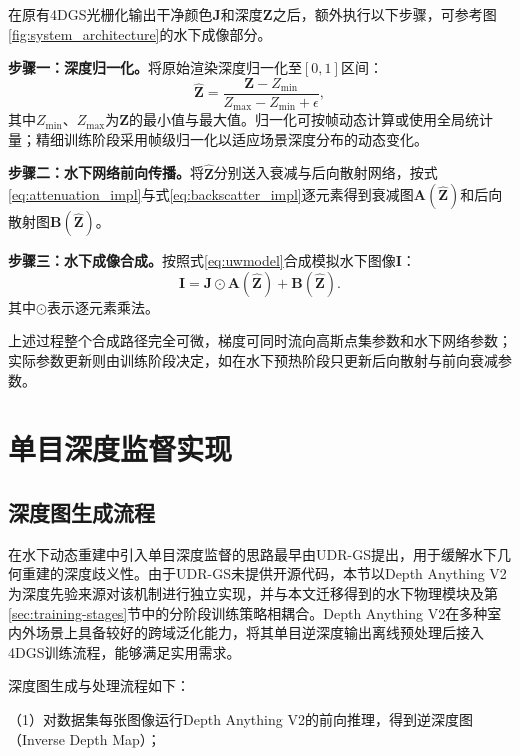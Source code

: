 在原有4DGS光栅化输出干净颜色$\mathbf{J}$和深度$\mathbf{Z}$之后，额外执行以下步骤，可参考图\ref{fig:system_architecture}的水下成像部分。

\textbf{步骤一：深度归一化。}将原始渲染深度归一化至$[0,1]$区间：
\begin{equation}
  \hat{\mathbf{Z}} = \frac{\mathbf{Z} - Z_{\min}}{Z_{\max} - Z_{\min} + \epsilon},
  \label{eq:depthnorm}
\end{equation}其中$Z_{\min}$、$Z_{\max}$为$\mathbf{Z}$的最小值与最大值。归一化可按帧动态计算或使用全局统计量；精细训练阶段采用帧级归一化以适应场景深度分布的动态变化。

\textbf{步骤二：水下网络前向传播。}将$\hat{\mathbf{Z}}$分别送入衰减与后向散射网络，按式\eqref{eq:attenuation_impl}与式\eqref{eq:backscatter_impl}逐元素得到衰减图$\mathbf{A}(\hat{\mathbf{Z}})$和后向散射图$\mathbf{B}(\hat{\mathbf{Z}})$。

\textbf{步骤三：水下成像合成。}按照式\eqref{eq:uwmodel}合成模拟水下图像$\mathbf{I}$：
\begin{equation}
  \mathbf{I} = \mathbf{J} \odot \mathbf{A}(\hat{\mathbf{Z}}) + \mathbf{B}(\hat{\mathbf{Z}}).
  \label{eq:synthesis}
\end{equation}其中$\odot$表示逐元素乘法。

上述过程整个合成路径完全可微，梯度可同时流向高斯点集参数和水下网络参数；实际参数更新则由训练阶段决定，如在水下预热阶段只更新后向散射与前向衰减参数。

\section{单目深度监督实现}

\subsection{深度图生成流程}

在水下动态重建中引入单目深度监督的思路最早由UDR-GS提出，用于缓解水下几何重建的深度歧义性。由于UDR-GS未提供开源代码，本节以Depth Anything V2为深度先验来源对该机制进行独立实现，并与本文迁移得到的水下物理模块及第\ref{sec:training-stages}节中的分阶段训练策略相耦合。Depth Anything V2在多种室内外场景上具备较好的跨域泛化能力，将其单目逆深度输出离线预处理后接入4DGS训练流程，能够满足实用需求。

深度图生成与处理流程如下：

（1）对数据集每张图像运行Depth Anything V2的前向推理，得到逆深度图（Inverse Depth Map）；

